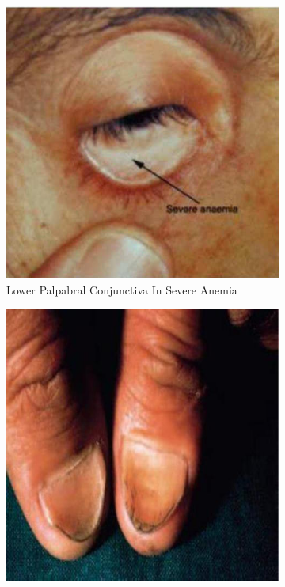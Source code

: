 \documentclass[a4paper,12pt]{book}
\begin{document}
{\begin{figure}[h]
\begin{subfigure}[t]{.23\textwidth}
																	\includegraphics[width=\textwidth]{./clinicalPhysioPic/pallor2.jpg}
																	\caption{Lower Palpabral Conjunctiva In Severe Anemia}
																	\label{pallor}
																\end{subfigure}
																\hspace{\fill}
																\begin{subfigure}[t]{.23\textwidth}
																	\centering
																	\includegraphics[width=\textwidth]{./clinicalPhysioPic/koilonychia.jpg}

\end{subfigure}
\end{figure}}
\end{document}
